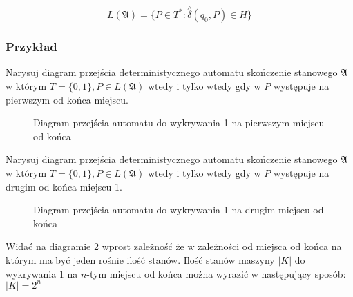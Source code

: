 \documentclass{../notatki}
\begin{document}
$$
L(\mathfrak{A}) = \{P \in T^* : \stackrel{\wedge}{\delta}(q_0, P) \in H\}
$$

\subsubsection{Przykład}

Narysuj diagram przejścia deterministycznego automatu skończenie
stanowego $\mathfrak{A}$ w którym $T=\{0, 1\}, P \in L(\mathfrak{A})$
wtedy i tylko wtedy gdy w $P$ występuje na pierwszym od końca miejscu.

\begin{figure}[H]
  \centering
  \caption{Diagram przejścia automatu do wykrywania 1 na pierwszym
  miejscu od końca}
  \label{fig:automat:1end}
\end{figure}

Narysuj diagram przejścia deterministycznego automatu skończenie
stanowego $\mathfrak{A}$ w którym $T=\{0, 1\}, P \in L(\mathfrak{A})$
wtedy i tylko wtedy gdy w $P$ występuje na drugim od końca miejscu 1.

\begin{figure}[H]
  \centering
  \caption{Diagram przejścia automatu do wykrywania 1 na drugim
  miejscu od końca}
  \label{fig:automat:2end}
\end{figure}

Widać na diagramie \ref{fig:automat:2end} wprost zależność że w
zależności od miejsca od końca na którym ma być jeden rośnie ilość stanów.
Ilość stanów maszyny $|K|$ do wykrywania 1 na $n$-tym miejscu od
końca można wyrazić w następujący sposób: $|K| = 2^n$
\end{document}
